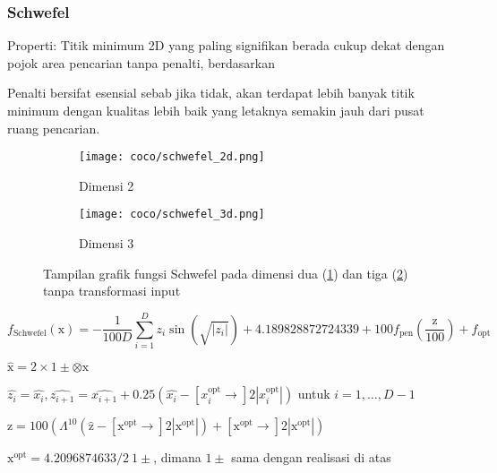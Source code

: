 \subsubsection*{Schwefel}
\noindent Properti:
Titik minimum 2D yang paling signifikan berada cukup dekat dengan pojok area pencarian tanpa penalti, berdasarkan \citep{Schwefel1981}
\begin{packed_item}
  \item Penalti bersifat esensial sebab jika tidak, akan terdapat lebih banyak titik minimum dengan kualitas lebih baik yang letaknya semakin jauh dari pusat ruang pencarian.
\end{packed_item}
\begin{figure}[H]
	\centering
	\begin{subfigure}[b]{0.4\textwidth}
		\centering
		\texttt{[image: coco/schwefel\_2d.png]}
		\caption{Dimensi 2}
		\label{fig:schwefel_coco_2d}
	\end{subfigure}
	\hfill
	\begin{subfigure}[b]{0.4\textwidth}
		\centering
		\texttt{[image: coco/schwefel\_3d.png]}
		\caption{Dimensi 3}
		\label{fig:schwefel_coco_3d}
	\end{subfigure}
	\caption{Tampilan grafik fungsi Schwefel pada dimensi dua (\cref{fig:schwefel_coco_2d}) dan tiga (\cref{fig:schwefel_coco_3d}) tanpa transformasi input}
	\label{fig:schwefel_coco}
\end{figure}
\begin{equation}
  f_{\text{Schwefel}}(\mathrm{x})=-\frac{1}{100D}\sum_{i=1}^{D}z_i\sin(\sqrt{|z_i|})+4.189828872724339+100f_{\text{pen}}(\frac{\mathrm{z}}{100})+f_{\text{opt}}
\end{equation}
\begin{packed_item}
    \item $\hat{\mathrm{x}}=2\times 1\pm\otimes\mathrm{x}$
    \item $\hat{z_i}=\hat{x_i},\hat{z_{i+1}}=\hat{x_{i+1}}+0.25(\hat{x_i}-[x_i^{\text{opt}}\to]2|x_i^{\text{opt}}|)$ untuk $i=1,\ldots,D-1$
    \item $\mathrm{z}=100(\Lambda^{10}(\hat{\mathrm{z}}-[\mathrm{x}^{\text{opt}}\to]2|\mathrm{x}^{\text{opt}}|)+[\mathrm{x}^{\text{opt}}\to]2|\mathrm{x}^{\text{opt}}|)$
    \item $\mathrm{x}^{\text{opt}}=4.2096874633/2\ 1\pm$, dimana $1\pm$ sama dengan realisasi di atas
\end{packed_item}

